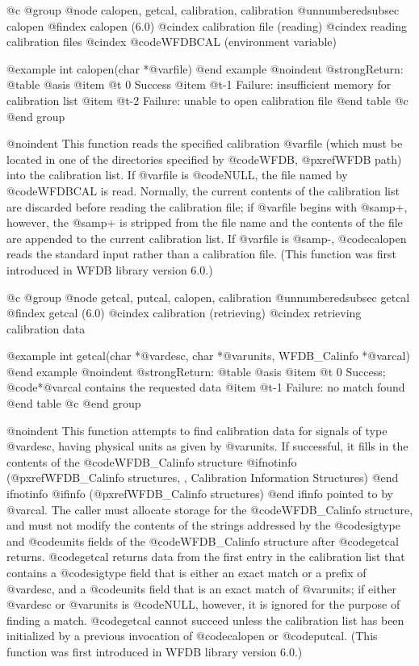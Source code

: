 {{{{{{{{@c @group
@node   calopen, getcal, calibration, calibration
@unnumberedsubsec calopen
@findex calopen (6.0)
@cindex calibration file (reading)
@cindex reading calibration files
@cindex @code{WFDBCAL} (environment variable)

@example
int calopen(char *@var{file})
@end example
@noindent
@strong{Return:}
@table @asis
@item @t{ 0}
Success
@item @t{-1}
Failure: insufficient memory for calibration list
@item @t{-2}
Failure: unable to open calibration file
@end table
@c @end group

@noindent
This function reads the specified calibration @var{file} (which must be
located in one of the directories specified by @code{WFDB},
@pxref{WFDB path}) into the calibration list.  If @var{file} is
@code{NULL}, the file named by @code{WFDBCAL} is read.  Normally, the
current contents of the calibration list are discarded before reading
the calibration file; if @var{file} begins with @samp{+}, however, the
@samp{+} is stripped from the file name and the contents of the file are
appended to the current calibration list.  If @var{file} is @samp{-},
@code{calopen} reads the standard input rather than a calibration file.
(This function was first introduced in WFDB library version 6.0.)

@c @group
@node   getcal, putcal, calopen, calibration
@unnumberedsubsec getcal
@findex getcal (6.0)
@cindex calibration (retrieving)
@cindex retrieving calibration data

@example
int getcal(char *@var{desc}, char *@var{units}, WFDB_Calinfo *@var{cal})
@end example
@noindent
@strong{Return:}
@table @asis
@item @t{ 0}
Success;  @code{*@var{cal}} contains the requested data
@item @t{-1}
Failure: no match found
@end table
@c @end group

@noindent
This function attempts to find calibration data for signals of type
@var{desc}, having physical units as given by @var{units}.  If
successful, it fills in the contents of the @code{WFDB_Calinfo} structure
@ifnotinfo
(@pxref{WFDB_Calinfo structures, , Calibration Information Structures})
@end ifnotinfo
@ifinfo
(@pxref{WFDB_Calinfo structures})
@end ifinfo
pointed to by @var{cal}.  The caller must allocate storage for the
@code{WFDB_Calinfo} structure, and must not modify the contents of the
strings addressed by the @code{sigtype} and @code{units} fields of the
@code{WFDB_Calinfo} structure after @code{getcal} returns.  @code{getcal}
returns data from the first entry in the calibration list that contains
a @code{sigtype} field that is either an exact match or a prefix of
@var{desc}, and a @code{units} field that is an exact match of
@var{units}; if either @var{desc} or @var{units} is @code{NULL},
however, it is ignored for the purpose of finding a match.
@code{getcal} cannot succeed unless the calibration list has been
initialized by a previous invocation of @code{calopen} or @code{putcal}.
(This function was first introduced in WFDB library version 6.0.)

}}}}}}}}
